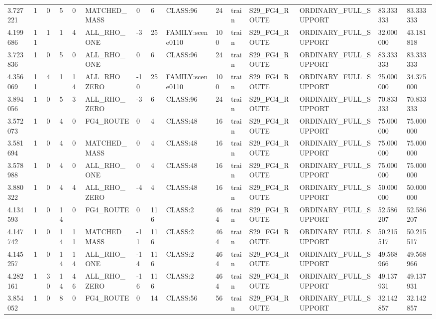 \begin{tabular}{lllllllllllllll}
3.727221 & 1 & 0 & 5 & 0 & MATCHED\_MASS & 0 & 6 & CLASS:96 & 24 & train & S29\_FG4\_ROUTE & ORDINARY\_FULL\_SUPPORT & 83.333333 & 83.333333 \\
4.199686 & 11 & 1 & 1 & 4 & ALL\_RHO\_ONE & -3 & 25 & FAMILY:scene0110 & 100 & train & S29\_FG4\_ROUTE & ORDINARY\_FULL\_SUPPORT & 32.000000 & 43.181818 \\
3.723836 & 1 & 0 & 5 & 0 & ALL\_RHO\_ONE & 0 & 6 & CLASS:96 & 24 & train & S29\_FG4\_ROUTE & ORDINARY\_FULL\_SUPPORT & 83.333333 & 83.333333 \\
4.356069 & 11 & 4 & 1 & 14 & ALL\_RHO\_ZERO & -10 & 25 & FAMILY:scene0110 & 100 & train & S29\_FG4\_ROUTE & ORDINARY\_FULL\_SUPPORT & 25.000000 & 34.375000 \\
3.894056 & 1 & 0 & 5 & 3 & ALL\_RHO\_ZERO & -3 & 6 & CLASS:96 & 24 & train & S29\_FG4\_ROUTE & ORDINARY\_FULL\_SUPPORT & 70.833333 & 70.833333 \\
3.572073 & 1 & 0 & 4 & 0 & FG4\_ROUTE & 0 & 4 & CLASS:48 & 16 & train & S29\_FG4\_ROUTE & ORDINARY\_FULL\_SUPPORT & 75.000000 & 75.000000 \\
3.581694 & 1 & 0 & 4 & 0 & MATCHED\_MASS & 0 & 4 & CLASS:48 & 16 & train & S29\_FG4\_ROUTE & ORDINARY\_FULL\_SUPPORT & 75.000000 & 75.000000 \\
3.578988 & 1 & 0 & 4 & 0 & ALL\_RHO\_ONE & 0 & 4 & CLASS:48 & 16 & train & S29\_FG4\_ROUTE & ORDINARY\_FULL\_SUPPORT & 75.000000 & 75.000000 \\
3.880322 & 1 & 0 & 4 & 4 & ALL\_RHO\_ZERO & -4 & 4 & CLASS:48 & 16 & train & S29\_FG4\_ROUTE & ORDINARY\_FULL\_SUPPORT & 50.000000 & 50.000000 \\
4.134593 & 1 & 0 & 14 & 0 & FG4\_ROUTE & 0 & 116 & CLASS:2 & 464 & train & S29\_FG4\_ROUTE & ORDINARY\_FULL\_SUPPORT & 52.586207 & 52.586207 \\
4.147742 & 1 & 0 & 14 & 11 & MATCHED\_MASS & -11 & 116 & CLASS:2 & 464 & train & S29\_FG4\_ROUTE & ORDINARY\_FULL\_SUPPORT & 50.215517 & 50.215517 \\
4.145257 & 1 & 0 & 14 & 14 & ALL\_RHO\_ONE & -14 & 116 & CLASS:2 & 464 & train & S29\_FG4\_ROUTE & ORDINARY\_FULL\_SUPPORT & 49.568966 & 49.568966 \\
4.282161 & 1 & 30 & 14 & 46 & ALL\_RHO\_ZERO & -16 & 116 & CLASS:2 & 464 & train & S29\_FG4\_ROUTE & ORDINARY\_FULL\_SUPPORT & 49.137931 & 49.137931 \\
3.854052 & 1 & 0 & 8 & 0 & FG4\_ROUTE & 0 & 14 & CLASS:56 & 56 & train & S29\_FG4\_ROUTE & ORDINARY\_FULL\_SUPPORT & 32.142857 & 32.142857 \\

\end{tabular}
